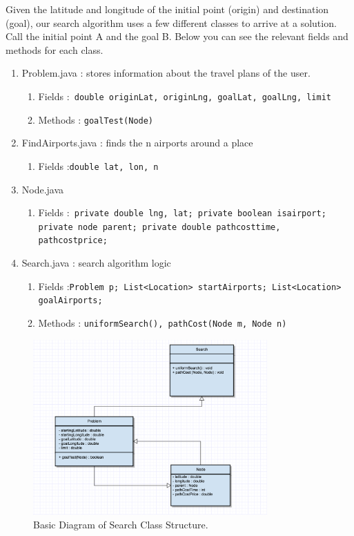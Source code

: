 \documentclass[11pt]{article}
\begin{document}
Given the latitude and longitude of the initial point (origin) and destination (goal), our search algorithm uses a few different classes to arrive at a solution.
Call the initial point A and the goal B. Below you can see the relevant fields and methods for each class.
\begin{enumerate}
\item Problem.java : stores information about the travel plans of the user. 
	\begin{enumerate}
	\item Fields :\texttt{  double originLat, originLng, goalLat, goalLng, limit}
	\item Methods : \texttt{goalTest(Node)}
	\end{enumerate}
\item FindAirports.java : finds the n airports around a place
\begin{enumerate}
\item Fields :\texttt{double lat, lon, n}
\end{enumerate}
\item Node.java 
	\begin{enumerate}
	\item Fields :\texttt{
    private double lng, lat;
    private boolean isairport;
    private node parent;
    private double pathcosttime, pathcostprice; }
	\end{enumerate}
\item Search.java : search algorithm logic
	\begin{enumerate}
	\item Fields :\texttt{Problem p;
    List<Location> startAirports;
    List<Location> goalAirports;}
    \item Methods : \texttt{uniformSearch(), pathCost(Node m, Node n)}
	\end{enumerate}
	
\end{enumerate}

\begin{figure}[!ht]
  \centering
  \includegraphics[width=0.8\textwidth]{UML.png}
  \caption{Basic Diagram of Search Class Structure.}
  \label{fig:time_lim}
\end{figure}
\end{document}
